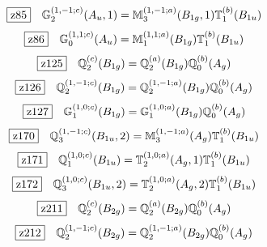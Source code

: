 \documentclass[fleqn,10pt,landscape]{jsarticle}
\begin{document}
\begin{dmath*}
\hspace*{3mm}\fbox{z85}\quad \mathbb{G}_{2}^{(1,-1;c)}(A_{u},1)=\mathbb{M}_{3}^{(1,-1;a)}(B_{1g},1) \mathbb{T}_{1}^{(b)}(B_{1u})
\end{dmath*}
\begin{dmath*}
\hspace*{3mm}\fbox{z86}\quad \mathbb{G}_{0}^{(1,1;c)}(A_{u})=\mathbb{M}_{1}^{(1,1;a)}(B_{1g}) \mathbb{T}_{1}^{(b)}(B_{1u})
\end{dmath*}
\begin{dmath*}
\hspace*{3mm}\fbox{z125}\quad \mathbb{Q}_{2}^{(c)}(B_{1g})=\mathbb{Q}_{2}^{(a)}(B_{1g}) \mathbb{Q}_{0}^{(b)}(A_{g})
\end{dmath*}
\begin{dmath*}
\hspace*{3mm}\fbox{z126}\quad \mathbb{Q}_{2}^{(1,-1;c)}(B_{1g})=\mathbb{Q}_{2}^{(1,-1;a)}(B_{1g}) \mathbb{Q}_{0}^{(b)}(A_{g})
\end{dmath*}
\begin{dmath*}
\hspace*{3mm}\fbox{z127}\quad \mathbb{G}_{1}^{(1,0;c)}(B_{1g})=\mathbb{G}_{1}^{(1,0;a)}(B_{1g}) \mathbb{Q}_{0}^{(b)}(A_{g})
\end{dmath*}
\begin{dmath*}
\hspace*{3mm}\fbox{z170}\quad \mathbb{Q}_{3}^{(1,-1;c)}(B_{1u},2)=\mathbb{M}_{3}^{(1,-1;a)}(A_{g}) \mathbb{T}_{1}^{(b)}(B_{1u})
\end{dmath*}
\begin{dmath*}
\hspace*{3mm}\fbox{z171}\quad \mathbb{Q}_{1}^{(1,0;c)}(B_{1u})=\mathbb{T}_{2}^{(1,0;a)}(A_{g},1) \mathbb{T}_{1}^{(b)}(B_{1u})
\end{dmath*}
\begin{dmath*}
\hspace*{3mm}\fbox{z172}\quad \mathbb{Q}_{3}^{(1,0;c)}(B_{1u},2)=\mathbb{T}_{2}^{(1,0;a)}(A_{g},2) \mathbb{T}_{1}^{(b)}(B_{1u})
\end{dmath*}
\begin{dmath*}
\hspace*{3mm}\fbox{z211}\quad \mathbb{Q}_{2}^{(c)}(B_{2g})=\mathbb{Q}_{2}^{(a)}(B_{2g}) \mathbb{Q}_{0}^{(b)}(A_{g})
\end{dmath*}
\begin{dmath*}
\hspace*{3mm}\fbox{z212}\quad \mathbb{Q}_{2}^{(1,-1;c)}(B_{2g})=\mathbb{Q}_{2}^{(1,-1;a)}(B_{2g}) \mathbb{Q}_{0}^{(b)}(A_{g})
\end{dmath*}
\end{document}
